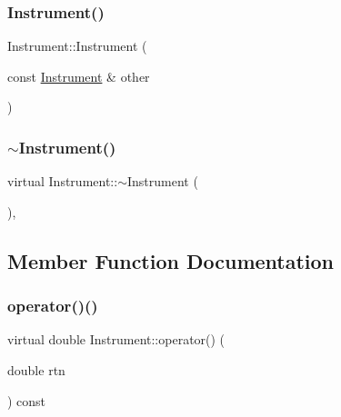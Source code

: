 \hypertarget{classInstrument_a2704ef015e35f22e444f8e15ece24be0}{}\label{classInstrument_a2704ef015e35f22e444f8e15ece24be0} 
\subsubsection{\texorpdfstring{Instrument()}{Instrument()}\hspace{0.1cm}{\footnotesize\ttfamily [2/2]}}
{\footnotesize\ttfamily Instrument\+::\+Instrument (\begin{DoxyParamCaption}\item[{const \hyperlink{classInstrument}{Instrument} \&}]{other }\end{DoxyParamCaption})}

\hypertarget{classInstrument_a28512cef5ccbedc9094876866f06f921}{}\label{classInstrument_a28512cef5ccbedc9094876866f06f921} 
\subsubsection{\texorpdfstring{$\sim$\+Instrument()}{~Instrument()}}
{\footnotesize\ttfamily virtual Instrument\+::$\sim$\+Instrument (\begin{DoxyParamCaption}{ }\end{DoxyParamCaption})\hspace{0.3cm}{\ttfamily [inline]}, {\ttfamily [virtual]}}



\subsection{Member Function Documentation}
\hypertarget{classInstrument_a33b6faccaeb494858dee5c547de897b6}{}\label{classInstrument_a33b6faccaeb494858dee5c547de897b6} 
\subsubsection{\texorpdfstring{operator()()}{operator()()}}
{\footnotesize\ttfamily virtual double Instrument\+::operator() (\begin{DoxyParamCaption}\item[{double}]{rtn }\end{DoxyParamCaption}) const\hspace{0.3cm}{\ttfamily [pure virtual]}}



